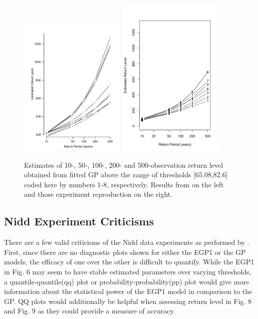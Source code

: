 \documentclass[12pt]{article}
\theoremstyle{definition}
\theoremstyle{definition}
\begin{document}
\begin{figure}[H]
\begin{center}
{\includegraphics[width=2.0in]{project/papafiles/fig6.papa.gp.png}}
{\includegraphics[width=2.0in]{project/papafiles/fig6.me.gp.png}}
\caption{Estimates of 10-, 50-, 100-, 200- and 500-observation return level obtained from fitted GP above the range of thresholds [65.08,82.6] coded here by numbers 1-8, respectively. Results from \cite{papatawn} on the left and those experiment reproduction on the right.}
\end{center}
\end{figure}
\subsection{Nidd Experiment Criticisms}
There are a few valid criticisms of the Nidd data experiments as performed by \cite{papatawn}. First, since there are no diagnostic plots shown for either the EGP1 or the GP models, the efficacy of one over the other is difficult to quantify. While the EGP1 in Fig. 6 may seem to have stable estimated parameters over varying thresholds, a quantile-quantile(qq) plot or probability-probability(pp) plot would give more information about the statistical power of the EGP1 model in comparison to the GP. QQ plots would additionally be helpful when assessing return level in Fig. 8 and Fig. 9 as they could provide a measure of accuracy.
\end{document}
